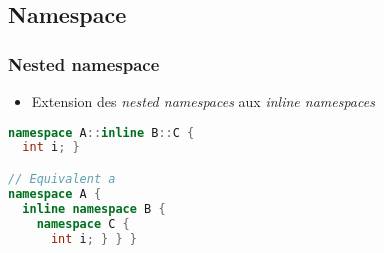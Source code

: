 \documentclass[C++.tex]{subfiles}
\begin{document}
\subsection*{Namespace}
\begin{frame}[fragile]
	\frametitle{Nested namespace}
	\begin{itemize}
		\item Extension des \textit{nested namespaces} aux \textit{inline namespaces}
	\end{itemize}

	\begin{lstlisting}[language=C++]
namespace A::inline B::C { 
  int i; }

// Equivalent a
namespace A {
  inline namespace B {
    namespace C {
      int i; } } }\end{lstlisting}

\end{frame}
\end{document}
